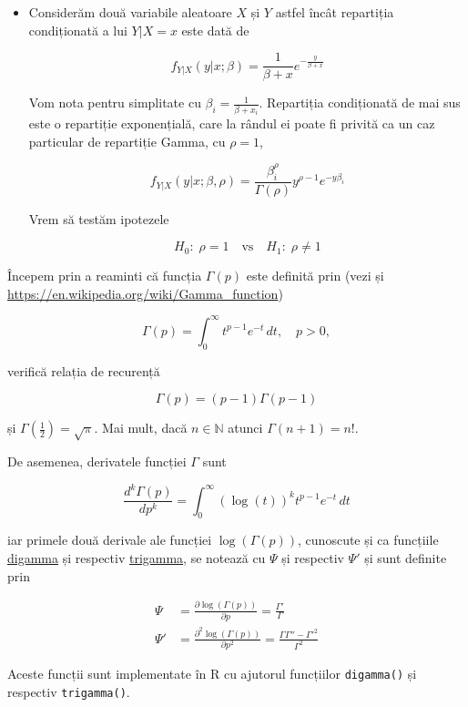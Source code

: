 \documentclass[]{article}
\newenvironment{frshaded*}{%
  \def\FrameCommand{\fboxrule=\FrameRule\fboxsep=\FrameSep \fcolorbox{framecolor}{shadecolor1}}%
  \MakeFramed {\advance\hsize-\width \FrameRestore}}%
{\endMakeFramed}
\newenvironment{rmdblock}[1]
  {\begin{frshaded*}
  \begin{itemize}
  \renewcommand{\labelitemi}{
    \raisebox{-.7\height}[0pt][0pt]{
      {\setkeys{Gin}{width=2em,keepaspectratio}\texttt{[image: images/icons/\#1]}}
    }
  }
  \item
  }
  {
  \end{itemize}
  \end{frshaded*}
  }
\newenvironment{rmdexercise}
  {\begin{rmdblock}{exercise}}
  {\end{rmdblock}}
\begin{document}
\begin{rmdexercise}
Considerăm două variabile aleatoare \(X\) și \(Y\) astfel încât
repartiția condiționată a lui \(Y|X = x\) este dată de

\[
  f_{Y|X}(y|x;\beta) = \frac{1}{\beta + x}e^{-\frac{y}{\beta + x}}
\]

Vom nota pentru simplitate cu \(\beta_i = \frac{1}{\beta + x_i}\).
Repartiția condiționată de mai sus este o repartiție exponențială, care
la rândul ei poate fi privită ca un caz particular de repartiție Gamma,
cu \(\rho = 1\),

\[
  f_{Y|X}(y|x;\beta,\rho) = \frac{\beta_i^{\rho}}{\Gamma(\rho)}y^{\rho - 1}e^{-y\beta_i}
\]

Vrem să testăm ipotezele

\[
  H_0:\; \rho = 1 \quad \text{vs}\quad H_1:\; \rho\neq 1
\]
\end{rmdexercise}

Începem prin a reaminti că funcția \(\Gamma(p)\) este definită prin
(vezi și \url{https://en.wikipedia.org/wiki/Gamma_function})

\[
\Gamma(p) = \int_{0}^{\infty}t^{p-1}e^{-t}\,dt,\quad p>0,
\]

verifică relația de recurență

\[
\Gamma(p) = (p-1)\Gamma(p-1)
\]

și \(\Gamma\left(\frac{1}{2}\right) = \sqrt{\pi}\). Mai mult, dacă
\(n\in\mathbb{N}\) atunci \(\Gamma(n+1) = n!\).

De asemenea, derivatele funcției \(\Gamma\) sunt

\[
\frac{d^k \Gamma(p)}{dp^k} = \int_{0}^{\infty}(\log(t))^kt^{p-1}e^{-t}\, dt
\]

iar primele două derivale ale funcției \(\log(\Gamma(p))\), cunoscute și
ca funcțiile
\href{https://en.wikipedia.org/wiki/Digamma_function}{digamma} și
respectiv
\href{https://en.wikipedia.org/wiki/Trigamma_function}{trigamma}, se
notează cu \(\Psi\) și respectiv \(\Psi'\) și sunt definite prin

\begin{align*}
  \Psi &= \frac{\partial \log(\Gamma(p))}{\partial p} = \frac{\Gamma'}{\Gamma}\\
  \Psi' &=\frac{\partial^2 \log(\Gamma(p))}{\partial p^2} = \frac{\Gamma\Gamma'' - \Gamma'^2}{\Gamma^2}
\end{align*}

Aceste funcții sunt implementate în R cu ajutorul funcțiilor
\texttt{digamma()} și respectiv \texttt{trigamma()}.
\end{document}
